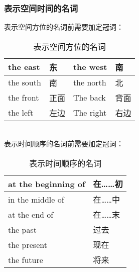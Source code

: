 \documentclass[UTF8]{ctexart}
\begin{document}
\subsubsection{表示空间时间的名词}
    表示空间方位的名词前需要加定冠词：
    \begin{table}[h!]
        \begin{center}
            \ttfamily
            \begin{tabular}{p{70pt}|p{40pt}|p{70pt}|p{40pt}}
                \hline
                the east&东&the west&南\\ \hline
                the south&南&the north&北\\ \hline
                the front&正面&The back&背面\\ \hline
                the left&左边&The right&右边\\ \hline
            \end{tabular}
            \caption{表示空间方位的名词}
            \rmfamily
        \end{center}
    \end{table}\\
    表示时间顺序的名词前需要加定冠词：
    \begin{table}[h!]
        \begin{center}
            \ttfamily
            \begin{tabular}{p{150pt}|p{70pt}}
                \hline
                at the beginning of&在……初\\ \hline
                in the middle of&在……中\\ \hline
                at the end of&在……末\\ \hline
                the past&过去\\ \hline
                the present&现在\\ \hline
                the future&将来\\ \hline
            \end{tabular}
            \caption{表示时间顺序的名词}
            \rmfamily
        \end{center}
    \end{table}
\end{document}
